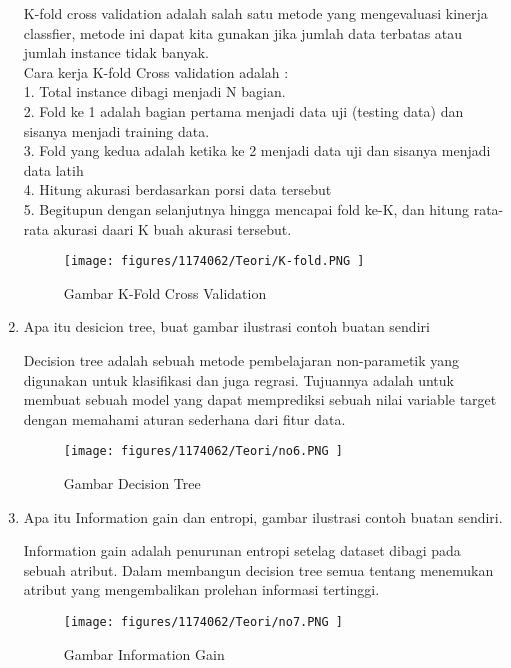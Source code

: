 \begin{enumerate}
K-fold cross validation adalah salah satu metode yang mengevaluasi kinerja classfier, metode ini dapat kita gunakan jika jumlah data terbatas atau jumlah instance tidak banyak.\\

Cara kerja K-fold Cross validation adalah :\\
1. Total instance dibagi menjadi N bagian.\\
2. Fold ke 1 adalah bagian pertama menjadi data uji (testing data) dan sisanya menjadi training data.\\
3. Fold yang kedua adalah ketika ke 2 menjadi data uji dan sisanya menjadi data latih\\
4. Hitung akurasi berdasarkan porsi data tersebut\\
5. Begitupun dengan selanjutnya hingga mencapai fold ke-K, dan hitung rata-rata akurasi daari K buah akurasi tersebut.\\

\begin{figure}[H]
	\texttt{[image: figures/1174062/Teori/K-fold.PNG ]}
	\centering
	\caption{Gambar K-Fold Cross Validation }
\end{figure}

\item Apa itu desicion tree, buat gambar ilustrasi contoh buatan sendiri

Decision tree adalah sebuah metode pembelajaran non-parametik yang digunakan untuk klasifikasi dan juga regrasi. Tujuannya adalah untuk membuat sebuah model yang dapat memprediksi sebuah nilai variable target dengan memahami aturan sederhana dari fitur data.

\begin{figure}[H]
	\texttt{[image: figures/1174062/Teori/no6.PNG ]}
	\centering
	\caption{Gambar Decision Tree }
\end{figure}

\item Apa itu Information gain dan entropi, gambar ilustrasi contoh buatan sendiri.

Information gain adalah penurunan entropi setelag dataset dibagi pada sebuah atribut. Dalam membangun decision tree semua tentang menemukan atribut yang mengembalikan prolehan informasi tertinggi.\\

\begin{figure}[H]
	\texttt{[image: figures/1174062/Teori/no7.PNG ]}
	\centering
	\caption{Gambar Information Gain }
\end{figure}


\end{enumerate}
